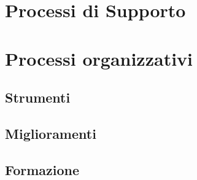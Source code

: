 \documentclass[a4paper, 11pt]{article}
\begin{document}







\pagebreak

\section{Processi di Supporto}











\pagebreak

\section{Processi organizzativi}



    \subsection{Strumenti}

    \subsection{Miglioramenti}

    \subsection{Formazione}
\end{document}
